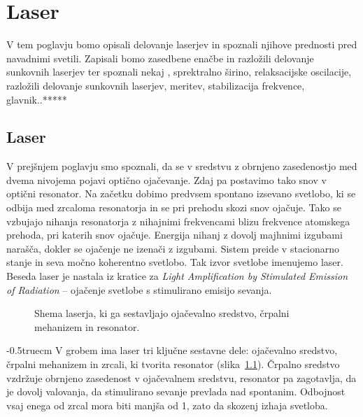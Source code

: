 \chapter{Laser}

V tem poglavju bomo opisali delovanje laserjev in spoznali njihove prednosti
pred navadnimi svetili. Zapisali bomo zasedbene enačbe in razložili delovanje 
sunkovnih laserjev ter spoznali nekaj 
, sprektralno širino, relaksacijske oscilacije, razložili delovanje sunkovnih
laserjev, meritev, stabilizacija frekvence, glavnik..*****

\section{Laser}

V prejšnjem poglavju smo spoznali, da se v sredstvu z obrnjeno zasedenostjo
med dvema nivojema pojavi optično ojačevanje. Zdaj pa postavimo tako snov 
v optični resonator. Na začetku dobimo predvsem spontano izsevano svetlobo, ki se
odbija med zrcaloma resonatorja in se pri prehodu skozi snov ojačuje. Tako
se vzbujajo nihanja resonatorja z nihajnimi frekvencami blizu frekvence
atomskega prehoda, pri katerih snov ojačuje. Energija nihanj z dovolj
majhnimi izgubami narašča, dokler se ojačenje ne izenači z izgubami.
Sistem preide v stacionarno stanje in seva močno koherentno svetlobo. Tak
izvor svetlobe imenujemo laser. Beseda laser je nastala iz kratice za {\it Light
Amplification by Stimulated Emission of Radiation} --  ojačenje svetlobe s
stimulirano emisijo sevanja.
\begin{figure}[h]
\centering
\def\svgwidth{110truemm} 

\caption{Shema laserja, ki ga sestavljajo ojačevalno sredstvo, črpalni mehanizem
in resonator.}
\label{fig:shemalaserja}
\end{figure}
\vglue-0.5truecm
V grobem ima laser tri ključne sestavne dele: ojačevalno sredstvo, 
črpalni mehanizem in zrcali, ki tvorita resonator (slika~\ref{fig:shemalaserja}). Črpalno
sredstvo vzdržuje obrnjeno zasedenost v ojačevalnem sredstvu, resonator pa zagotavlja,
da je dovolj valovanja, da stimulirano sevanje prevlada nad spontanim.
Odbojnost vsaj enega od zrcal mora biti manjša od 1, zato da skozenj izhaja svetloba.

